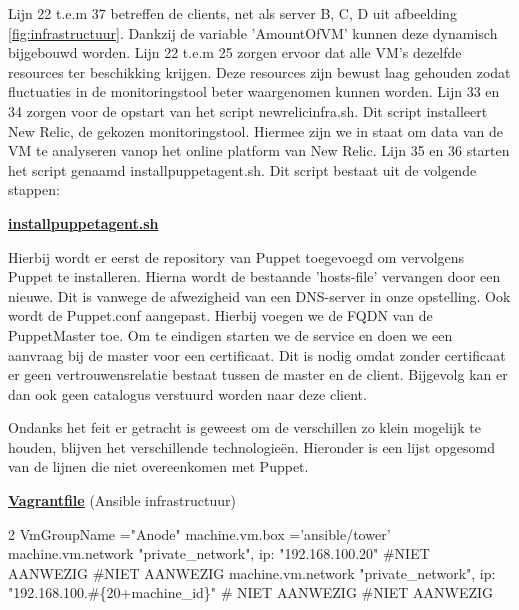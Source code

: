 Lijn 22 t.e.m 37 betreffen de clients, net als server B, C, D uit afbeelding  \ref{fig:infrastructuur}. Dankzij de variable 'AmountOfVM' kunnen deze dynamisch bijgebouwd worden. 
Lijn 22 t.e.m 25 zorgen ervoor dat alle VM's dezelfde resources ter beschikking krijgen. Deze resources zijn bewust laag gehouden zodat fluctuaties in de monitoringstool beter waargenomen kunnen worden.
Lijn 33 en 34 zorgen voor de opstart van het script newrelicinfra.sh. Dit script installeert New Relic, de gekozen monitoringstool. Hiermee zijn we in staat om data van de VM  te analyseren vanop het online platform van New Relic.
Lijn 35 en 36 starten het script genaamd installpuppetagent.sh. Dit script bestaat uit de volgende stappen:

\underline{\textbf{installpuppetagent.sh}} 


Hierbij wordt er eerst de repository van Puppet toegevoegd om vervolgens Puppet te installeren. Hierna wordt de bestaande 'hosts-file' vervangen  door een nieuwe. Dit is vanwege de afwezigheid van een DNS-server in onze opstelling. Ook wordt de Puppet.conf aangepast. Hierbij voegen we de FQDN van de PuppetMaster toe. Om te eindigen starten we de service en doen we een aanvraag bij de master voor een certificaat. Dit is nodig omdat zonder certificaat er geen vertrouwensrelatie bestaat tussen de master en de client. Bijgevolg kan er dan ook geen catalogus verstuurd worden naar deze client.


Ondanks het feit er getracht is geweest om de verschillen zo klein mogelijk te houden, blijven het verschillende technologie\"en. Hieronder is een lijst opgesomd van de lijnen die niet overeenkomen met Puppet.

\underline{\textbf{Vagrantfile}} (Ansible infrastructuur)\newline\newline

2 VmGroupName ="Anode"  machine.vm.box ='ansible/tower'   machine.vm.network "private\_network", ip: "192.168.100.20"   \#NIET AANWEZIG  \#NIET AANWEZIG  machine.vm.network "private\_network", ip: "192.168.100.\#\{20+machine\_id\}"    \# NIET AANWEZIG \#NIET AANWEZIG\newline


